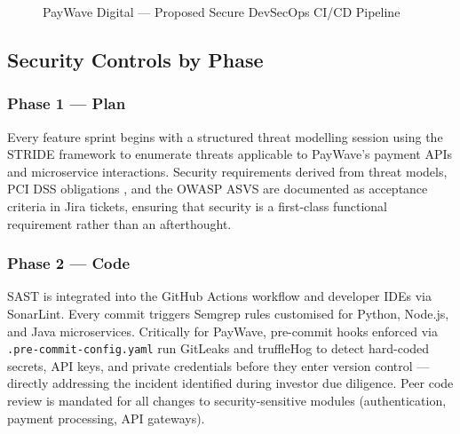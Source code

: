 \documentclass[12pt,a4paper]{article}
\begin{document}
\begin{landscape}
\begin{figure}[H]
{
  }%
  \caption{PayWave Digital --- Proposed Secure DevSecOps CI/CD Pipeline}
  \label{fig:pipeline}
\end{figure}
\end{landscape}

\subsection{Security Controls by Phase}

\subsubsection*{Phase 1 — Plan}

Every feature sprint begins with a structured threat modelling session using the STRIDE
framework to enumerate threats applicable to PayWave's payment APIs and microservice
interactions. Security requirements derived from threat models, PCI DSS obligations
\citep{pciDSS2022}, and the OWASP ASVS \citep{owaspasvs} are documented as acceptance
criteria in Jira tickets, ensuring that security is a first-class functional requirement rather than an
afterthought.

\subsubsection*{Phase 2 — Code}

SAST is integrated into the GitHub Actions workflow and developer IDEs via SonarLint. Every
commit triggers Semgrep rules customised for Python, Node.js, and Java microservices.
Critically for PayWave, pre-commit hooks enforced via \texttt{.pre-commit-config.yaml} run
GitLeaks and truffleHog to detect hard-coded secrets, API keys, and private credentials
before they enter version control --- directly addressing the incident identified during
investor due diligence. Peer code review is mandated for all changes to security-sensitive
modules (authentication, payment processing, API gateways).
\end{document}

